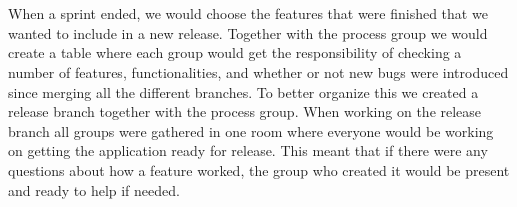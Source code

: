 \\
\\
When a sprint ended, we would choose the features that were finished that we wanted to include in a new release.
Together with the process group we would create a table where each group would get the responsibility of checking a number of features, functionalities, and whether or not new bugs were introduced since merging all the different branches.
To better organize this we created a release branch together with the process group.
When working on the release branch all groups were gathered in one room where everyone would be working on getting the application ready for release.
This meant that if there were any questions about how a feature worked, the group who created it would be present and ready to help if needed.
